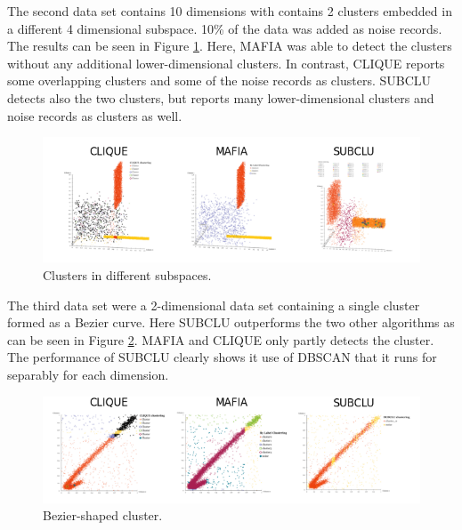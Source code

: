 The second data set contains 10 dimensions with contains 2 clusters embedded in a different 4 dimensional subspace. 10\% of the data was added as noise records. The results can be seen in Figure \ref{fig:accuracy_2clusters}. Here, MAFIA was able to detect the clusters without any additional lower-dimensional clusters. In contrast, CLIQUE reports some overlapping clusters and some of the noise records as clusters. SUBCLU detects also the two clusters, but reports many lower-dimensional clusters and noise records as clusters as well.
\begin{figure}
    \centering
    \includegraphics[scale=0.38]{figures/accuracy_2clusters.png}
    \caption{Clusters in different subspaces.}
    \label{fig:accuracy_2clusters}
\end{figure}

The third data set were a 2-dimensional data set containing a single cluster formed as a Bezier curve. Here SUBCLU outperforms the two other algorithms as can be seen in Figure \ref{fig:accuracy_bezier}. MAFIA and CLIQUE only partly detects the cluster. The performance of SUBCLU clearly shows it use of DBSCAN that it runs for separably for each dimension.
\begin{figure}
    \centering
    \includegraphics[scale=0.4]{figures/accuracy_bezier.png}
    \caption{Bezier-shaped cluster.}
    \label{fig:accuracy_bezier}
\end{figure}

